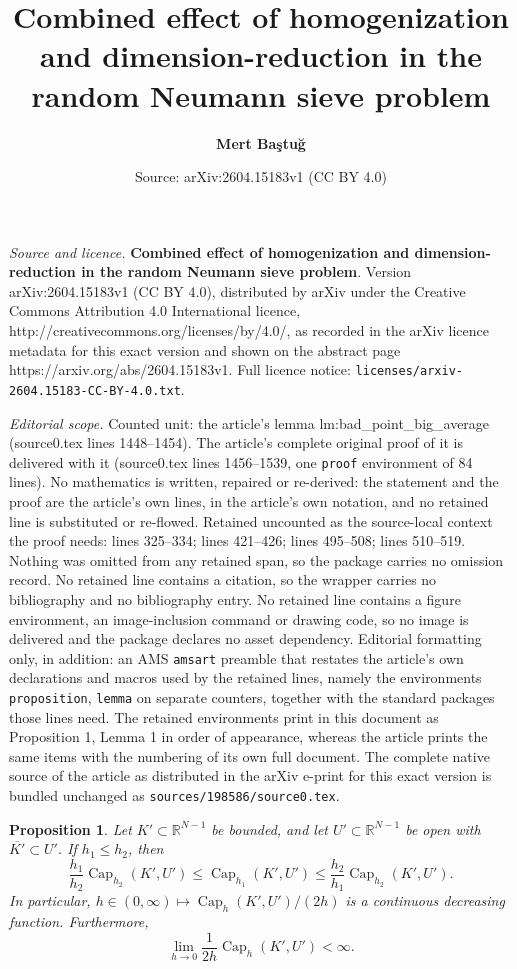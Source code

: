 \documentclass[10pt,a4paper]{amsart}
\title{\textbf{Combined effect of homogenization and dimension-reduction in the random Neumann sieve problem}}
\author{\textbf{Mert Baştuğ}}
\date{Source: arXiv:2604.15183v1 (CC BY 4.0)}
\newtheorem{proposition}{Proposition}
\newcommand{\cpct}{\operatorname{Cap}}
\begin{document}
\maketitle

\noindent\emph{Source and licence.} \textbf{Combined effect of homogenization and dimension-reduction in the random Neumann sieve problem}. Version arXiv:2604.15183v1 (CC BY 4.0), distributed by arXiv under the Creative Commons Attribution 4.0 International licence, http://creativecommons.org/licenses/by/4.0/, as recorded in the arXiv licence metadata for this exact version and shown on the abstract page https://arxiv.org/abs/2604.15183v1. Full licence notice: \texttt{licenses/arxiv-2604.15183-CC-BY-4.0.txt}.\par\smallskip

\noindent\textit{Editorial scope.} Counted unit: the article's lemma lm:bad\_point\_big\_average (source0.tex lines 1448--1454). The article's complete original proof of it is delivered with it (source0.tex lines 1456--1539, one \texttt{proof} environment of 84 lines). No mathematics is written, repaired or re-derived: the statement and the proof are the article's own lines, in the article's own notation, and no retained line is substituted or re-flowed.  Retained uncounted as the source-local context the proof needs: lines 325--334; lines 421--426; lines 495--508; lines 510--519.  Nothing was omitted from any retained span, so the package carries no omission record.  No retained line contains a citation, so the wrapper carries no bibliography and no bibliography entry.  No retained line contains a figure environment, an image-inclusion command or drawing code, so no image is delivered and the package declares no asset dependency.  Editorial formatting only, in addition: an AMS \texttt{amsart} preamble that restates the article's own declarations and macros used by the retained lines, namely the environments \texttt{proposition}, \texttt{lemma} on separate counters, together with the standard packages those lines need.  The retained environments print in this document as Proposition 1, Lemma 1 in order of appearance, whereas the article prints the same items with the numbering of its own full document.  The complete native source of the article as distributed in the arXiv e-print for this exact version is bundled unchanged as \texttt{sources/198586/source0.tex}.
\begin{proposition} \label{pr:continuity_in_h}
    Let $K' \subset \mathbb{R}^{N - 1}$ be bounded, and let $U' \subset \mathbb{R}^{N - 1}$ be open with $\overline{K'} \subset U'$. If $h_1 \le h_2$, then
    \begin{equation} \label{eq:comparison_in_h}
        \frac{h_1}{h_2} \cpct_{h_2}(K', U') \le \cpct_{h_1}(K', U') \le \frac{h_2}{h_1} \cpct_{h_2}(K', U').
    \end{equation}
    In particular, $h \in (0, \infty) \mapsto \cpct_h(K', U')/(2h)$ is a continuous decreasing function. Furthermore,
    \begin{equation} \label{eq:finite_limit}
        \lim_{h \to 0} \frac{1}{2h} \cpct_h(K', U') < \infty.
    \end{equation}
\end{proposition}
\end{document}
